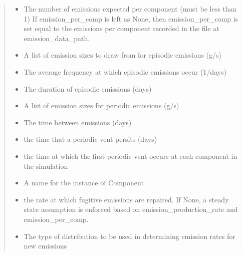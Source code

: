\documentclass[letterpaper,10pt,english]{sphinxmanual}
\begin{document}
\begin{fulllineitems}
\begin{quote}
\begin{description}
\begin{itemize}
\item {} 
 \textendash{} The number of emissions expected per component (must be less than 1)
If emission\_per\_comp is left as None, then emission\_per\_comp is set equal to the emissions per component
recorded in the file at emission\_data\_path.

\item {} 
 \textendash{} A list of emission sizes to draw from for episodic emissions (g/s)

\item {} 
 \textendash{} The average frequency at which episodic emissions occur (1/days)

\item {} 
 \textendash{} The duration of episodic emissions (days)

\item {} 
 \textendash{} A list of emission sizes for periodic emissions (g/s)

\item {} 
 \textendash{} The time between emissions (days)

\item {} 
 \textendash{} the time that a periodic vent persits (days)

\item {} 
 \textendash{} the time at which the first periodic vent occurs at each component in the simulation

\item {} 
 \textendash{} A name for the instance of Component

\item {} 
 \textendash{} the rate at which fugitive emissions are repaired. If None, a steady state
assumption is enforced based on emission\_production\_rate and emission\_per\_comp.

\item {} 
 \textendash{} The type of distribution to be used in determining emission rates for new emissions

\end{itemize}

\end{description}\end{quote}

\end{fulllineitems}
\end{document}
